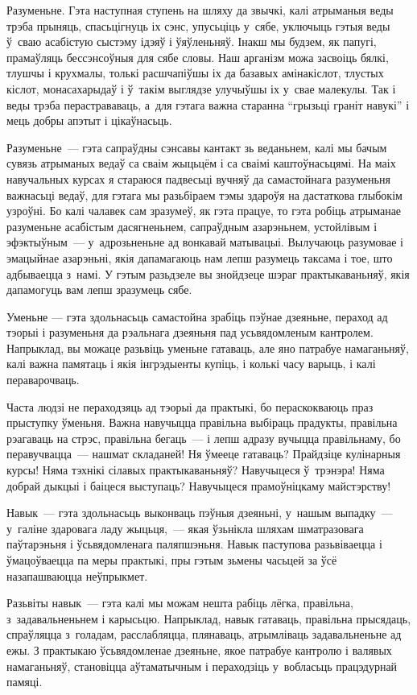 Разуменьне. Гэта наступная ступень на шляху да звычкі, калі атрыманыя веды трэба прыняць, спасьцігнуць іх сэнс, упусьціць у~сябе, уключыць гэтыя веды ў~сваю асабістую сыстэму ідэяў і ўяўленьняў. Інакш мы будзем, як папугі, прамаўляць бессэнсоўныя для сябе словы. Наш арганізм можа засвоіць бялкі, тлушчы і крухмалы, толькі расшчапіўшы іх да базавых амінакіслот, тлустых кіслот, монасахарыдаў і ў~такім выглядзе улучыўшы іх у~свае малекулы. Так і веды трэба перастрававаць, а~для гэтага важна старанна ``грызьці граніт навукі'' і мець добры апэтыт і цікаўнасьць.

Разуменьне~--- гэта сапраўдны сэнсавы кантакт зь веданьнем, калі мы бачым сувязь атрыманых ведаў са сваім жыцьцём і са сваімі каштоўнасьцямі. На маіх навучальных курсах я стараюся падвесьці вучняў да самастойнага разуменьня важнасьці ведаў, для гэтага мы разьбіраем тэмы здароўя на дастаткова глыбокім узроўні. Бо калі чалавек сам зразумеў, як гэта працуе, то гэта робіць атрыманае разуменьне асабістым дасягненьнем, сапраўдным азарэньнем, устойлівым і эфэктыўным~--- у~адрозьненьне ад вонкавай матывацыі. Вылучаюць разумовае і эмацыйнае азарэньні, якія дапамагаюць нам лепш разумець таксама і тое, што адбываецца з~намі. У гэтым разьдзеле вы знойдзеце шэраг практыкаваньняў, якія дапамогуць вам лепш зразумець сябе.

Уменьне — гэта здольнасьць самастойна зрабіць пэўнае дзеяньне, пераход ад тэорыі і разуменьня да рэальнага дзеяньня пад усьвядомленым кантролем. Напрыклад, вы можаце разьвіць уменьне гатаваць, але яно патрабуе намаганьняў, калі важна памятаць і якія інгрэдыенты купіць, і колькі часу варыць, і калі пераварочваць.

Часта людзі не пераходзяць ад тэорыі да практыкі, бо пераскокваюць праз прыступку ўменьня. Важна навучыцца правільна выбіраць прадукты, правільна рэагаваць на стрэс, правільна бегаць~--- і лепш адразу вучыцца правільнаму, бо перавучвацца~--- нашмат складаней! Ня ўмееце гатаваць? Прайдзіце кулінарныя курсы! Няма тэхнікі сілавых практыкаваньняў? Навучыцеся ў~трэнэра! Няма добрай дыкцыі і баіцеся выступаць? Навучыцеся прамоўніцкаму майстэрству!

Навык~--- гэта здольнасьць выконваць пэўныя дзеяньні, у~нашым выпадку~--- у~галіне здаровага ладу жыцьця,~--- якая ўзьнікла шляхам шматразовага паўтарэньня і ўсьвядомленага паляпшэньня. Навык паступова разьвіваецца і ўмацоўваецца па меры практыкі, пры гэтым зьмены часьцей за ўсё назапашваюцца неўпрыкмет.

Разьвіты навык~--- гэта калі мы можам нешта рабіць лёгка, правільна, з~задавальненьнем і карысьцю. Напрыклад, навык гатаваць, правільна прысядаць, спраўляцца з~голадам, расслабляцца, плянаваць, атрымліваць задавальненьне ад ежы. З практыкаю ўсьвядомленае дзеяньне, якое патрабуе кантролю і валявых намаганьняў, становіцца аўтаматычным і пераходзіць у~вобласьць працэдурнай памяці.

